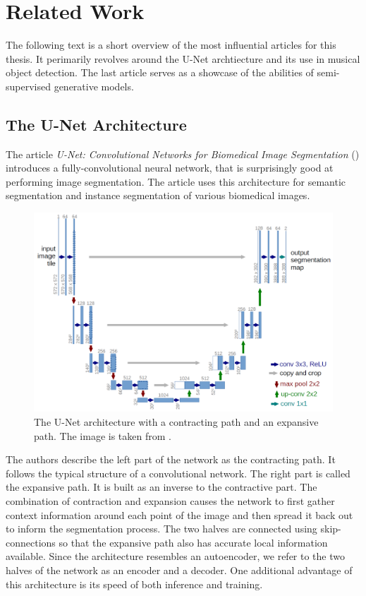 \chapter{Related Work}
\label{chap:RelatedWork}

The following text is a short overview of the most influential articles for this thesis. It perimarily revolves around the U-Net archtiecture and its use in musical object detection. The last article serves as a showcase of the abilities of semi-supervised generative models.

\section{The U-Net Architecture}

The article \emph{U-Net: Convolutional Networks for Biomedical Image Segmentation} (\cite{UNet}) introduces a fully-convolutional neural network, that is surprisingly good at performing image segmentation. The article uses this architecture for semantic segmentation and instance segmentation of various biomedical images.

\begin{figure}[ht]
    \centering
    \includegraphics[width=145mm]{../img/u-net-architecture.png}
    \caption{The U-Net architecture with a contracting path and an expansive path. The image is taken from \cite{UNet}.}
    \label{fig:UNetArchitecture}
\end{figure}

The authors describe the left part of the network as the contracting path. It follows the typical structure of a convolutional network. The right part is called the expansive path. It is built as an inverse to the contractive part. The combination of contraction and expansion causes the network to first gather context information around each point of the image and then spread it back out to inform the segmentation process. The two halves are connected using skip-connections so that the expansive path also has accurate local information available. Since the architecture resembles an autoencoder, we refer to the two halves of the network as an encoder and a decoder. One additional advantage of this architecture is its speed of both inference and training.


